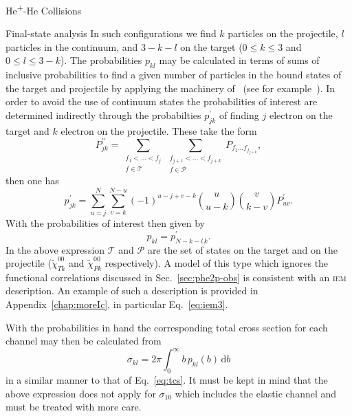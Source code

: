 \documentclass[a5paper, 9 pt]{extreport}
\begin{document}
\begin{chapter}{\texorpdfstring{He\textsuperscript{+}}{He+}-He Collisions \label{chap:hephe}}
\begin{section}{Final-state analysis \label{sec:hephe-det}}
      In such configurations we find $k$ particles on the projectile, $l$ particles in the continuum,
      and $3 - k - l$ on the target ($0\leq k \leq 3$ and $0 \leq l \leq 3 - k$). The probabilities
      $p_{kl}$ may be calculated in terms of sums of inclusive probabilities to find a given number of
      particles in the bound states of the target and projectile by applying the machinery
      of~\cite{inc-prob} (see for example~\cite{incEx, mitsuko12, gerald15}). In order to avoid the use
      of continuum states the probabilities of interest are determined indirectly through the
      probabilties $p^\prime_{jk}$ of finding $j$ electron on the target and $k$ electron on the
      projectile. These take the form
      \begin{equation} \label{eq:probGer1}
         P^{\prime\prime}_{jk} = \sum\limits_{\substack{f_1 < \dots < f_j \\ f \in \mathcal{T}}}
                         \sum\limits_{\substack{f_{j+1} < \dots < f_{j+k} \\ f \in \mathcal{P}}}
                         P_{f_1 \dots f_{f_{j+k}}},
      \end{equation}
      then one has
      \begin{equation} \label{eq:probGer2}
         p^\prime_{jk} = \sum\limits_{u = j}^N \sum\limits_{v = k}^{N-u} (-1)^{u - j + v -k}
                   {{u}\choose{u-k}} {{v}\choose{k - v}} P^\prime_{uv}.
      \end{equation}
      With the probabilities of interest then given by
      \begin{equation}
         p_{kl} = p^\prime_{N - k - l \, k}.
      \end{equation}
      In the above expression $\mathcal{T}$ and $\mathcal{P}$ are the set of states on the target
      and on the projectile ($\tilde{\chi}^{00}_{Tk}$ and $\tilde{\chi}^{00}_{Pk}$ respectively). A
      model of this type which ignores the functional correlations discussed in Sec.~\ref{sec:phe2p-obs}
      is consistent with an \textsc{iem} description. An example of such a description is provided in
      Appendix~\ref{chap:moreIc}, in particular Eq.~\eqref{eq:iem3}.

      With the probabilities in hand the corresponding total cross section for each channel may then be
      calculated from
      \begin{equation} \label{eq:cross}
         \sigma_{kl} = 2 \pi \int_0^\infty b \, p_{kl}(b) \, \mathrm{d}b
      \end{equation}
      in a similar manner to that of Eq.~\eqref{eq:tcs}. It must be kept in mind that the above
      expression does not apply for $\sigma_{10}$ which includes the elastic channel and must be
      treated with more care.


\end{section}
\end{chapter}
\end{document}
